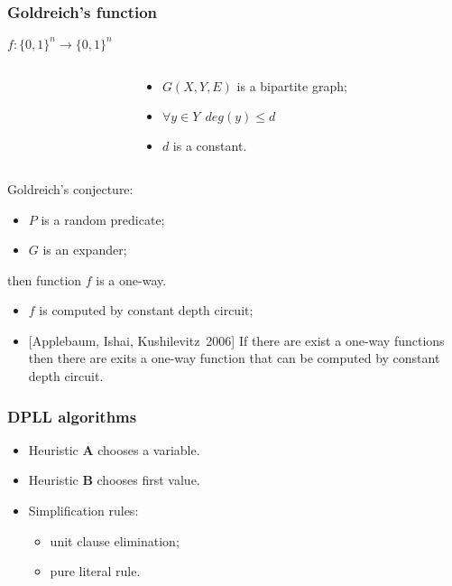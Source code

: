 \begin{frame}
	\frametitle{Goldreich's function}
	$f:\{0, 1\}^n \rightarrow \{0, 1\}^n$

    \pause

    \begin{columns}
    	\begin{column}{5.5cm}
            
        \end{column}

        \pause
        \pause
        \begin{column}{5.5cm}
            \begin{itemize}
	            \item $G(X, Y, E)$ is a bipartite graph;
            	\pause
                \item $\forall y \in Y ~~ deg(y) \le d$
            	\pause
            	\item $d$ is a constant.
            \end{itemize}
        \end{column}
	\end{columns}
    
	\pause

    Goldreich's conjecture:
    \begin{itemize}
	    \item $P$ is a random predicate;
    	\item $G$ is an expander;
    \end{itemize}
    then function $f$ is a one-way.

    \pause
    \begin{itemize}
	    \item $f$ is computed by constant depth circuit;
    	\pause
	    \item{} [Applebaum, Ishai, Kushilevitz~2006] If there are
		    exist a one-way functions then there are exits a one-way function that
            can be computed by constant depth circuit.
    \end{itemize}
\end{frame}

\begin{frame}
	\frametitle{DPLL algorithms}

   	
    
	\pause
    \pause
    \pause
    \pause
    \pause
    \begin{itemize}
        \item Heuristic $\mathbf{A}$ chooses a variable.
    	\pause
	    \item Heuristic $\mathbf{B}$ chooses first value.
    	\pause
    	\item Simplification rules:
	    \begin{itemize}
            \item unit clause elimination;
        	\item pure literal rule.
    	\end{itemize}
    \end{itemize}

\end{frame}

